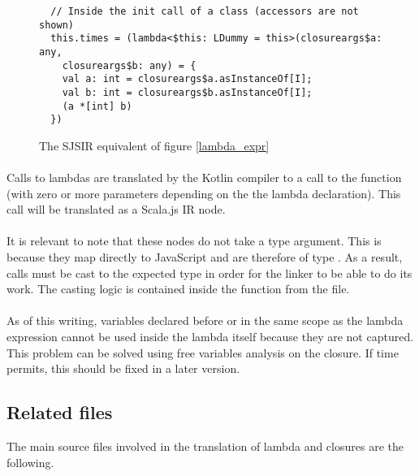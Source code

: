 \begin{figure}[h]
  \begin{verbatim}
  // Inside the init call of a class (accessors are not shown)
  this.times = (lambda<$this: LDummy = this>(closureargs$a: any,
    closureargs$b: any) = {
    val a: int = closureargs$a.asInstanceOf[I];
    val b: int = closureargs$b.asInstanceOf[I];
    (a *[int] b)
  })
  \end{verbatim}
  \caption{The SJSIR equivalent of figure \ref{lambda_expr}}
  \label{lambda_expr_ir}
\end{figure}



\paragraph{} Calls to lambdas are translated by the Kotlin compiler to a call to the 
 function (with zero or more parameters depending on the the lambda declaration). 
This call will be translated as a  Scala.js IR node.

\paragraph{} It is relevant to note that these nodes do not take a type argument. This is because 
they map directly to JavaScript and are therefore of type . As a result, 
calls must be cast to the expected type in order for the linker to be able to do its work. The 
casting logic is contained inside the  function from the  
file.

\paragraph{} As of this writing, variables declared before or in the same scope as the lambda 
expression cannot be used inside the lambda itself because they are not captured. This problem can 
be solved using free variables analysis on the closure. If time permits, this should be fixed in a 
later version.

\subsection{Related files} The main source files involved in the translation of lambda and 
closures are the following.

